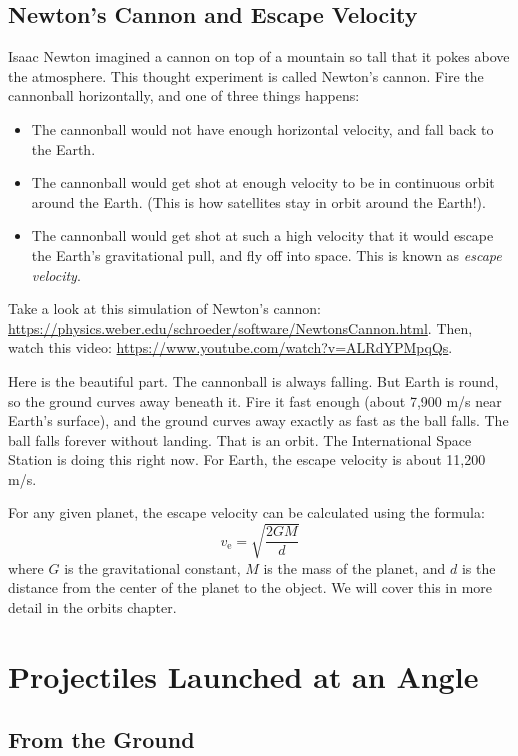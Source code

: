 \subsection{Newton's Cannon and Escape Velocity}
Isaac Newton imagined a cannon on top of a mountain so tall that it pokes
above the atmosphere. This thought experiment is called
Newton's cannon. Fire the cannonball horizontally,
and one of three things happens:
\begin{itemize}
    \item The cannonball would not have enough horizontal velocity, and fall back to the Earth. 
    \item The cannonball would get shot at enough velocity to be in continuous orbit around the Earth. (This is how satellites stay in orbit around the Earth!).
    \item The cannonball would get shot at such a high velocity that it would escape the Earth's gravitational pull, and fly off into space. This is known as \emph{escape velocity}. 
\end{itemize}

Take a look at this simulation of Newton's cannon: \url{https://physics.weber.edu/schroeder/software/NewtonsCannon.html}. Then, watch this video: \url{https://www.youtube.com/watch?v=ALRdYPMpqQs}.

Here is the beautiful part. The cannonball is always falling. But Earth
is round, so the ground curves away beneath it. Fire it fast enough (about
7,900 m/s near Earth's surface), and the ground curves away exactly as fast
as the ball falls. The ball falls forever without landing. That is an
orbit. The International Space Station is doing this right now. For Earth,
the escape velocity is about 11,200 m/s.

For any given planet, the escape velocity can be calculated using the formula:
$${\displaystyle v_{\text{e}}={\sqrt {\frac {2GM}{d}}}}$$
where $G$ is the gravitational constant, $M$ is the mass of the planet, and $d$ is the distance from the center of the planet to the object. We will cover this in more detail in the orbits chapter.
\section{Projectiles Launched at an Angle}

\subsection{From the Ground}

